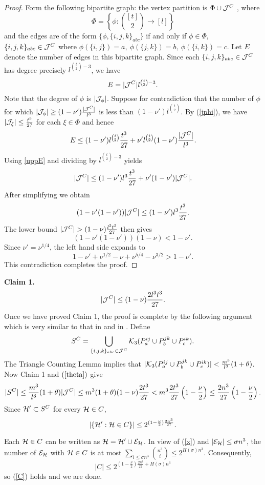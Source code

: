 \documentclass[11pt]{article}
\begin{document}
\begin{proof}  Form the following bipartite graph: the vertex partition is
$\Phi \cup {\cal J}^C$ , where
$$\Phi=\left\{\phi: {[t]\choose 2} \rightarrow [l]\right\}$$
and the edges are of the form $\{\phi, \{i,j,k\}_{abc}\}$ if and only if $\phi \in \Phi$,
 $\{i,j,k\}_{abc}\in {\cal J}^C$ where $\phi(\{i,j\})=a,\  \phi(\{j,k\})=b,\  \phi(\{i,k\})=c$.
 Let $E$ denote the number of edges in this bipartite graph. Since each $\{i,j,k\}_{abc} \in {\cal J}^C$ has degree precisely
$l^{{t \choose 2}-3}$, we have \begin{equation}\label{uppE}
E=|\cJ^C|
l^{{t \choose 2}-3}.\end{equation} Note that the degree of $\phi$ is
$|{\cal J}_{\phi}|$.
 Suppose for contradiction that the number of $\phi$ for which
 $|{\cal J}_{\phi}| \ge (1-\nu')\frac{|{\cal J}^C|}{l^3}$ is less than $(1-\nu') l^{{t \choose 2}}$.
  By (\ref{jphi}), we have $|{\cal J}_{\xi}|\le \frac{t^3}{27}$ for each $\xi\in \Phi$ and hence
\begin{equation}\label{upptwoE}E\le (1-\nu') l^{{t \choose 2}}\frac{t^3}{27} + \nu'l^{{t \choose
2}}(1-\nu')\frac{|\cJ^C|}{l^3}.\end{equation} Using \eqref{uppE}
 and dividing by $l^{{t \choose 2}-3}$  yields
$$|{\cal J}^C| \le (1-\nu')l^3\frac{t^3}{27} + \nu'(1-\nu')|{\cal J}^C|.$$
After simplifying we obtain
$$(1-\nu'(1-\nu'))|{\cal J}^C|\le (1-\nu')l^3\frac{t^3}{27}.$$
  The lower bound $|\cJ^C|>(1-\nu)\frac{l^3t^3}{27}$ then gives
$$(1-\nu'(1-\nu'))(1-\nu)< 1-\nu'.$$
Since $\nu'=\nu^{1/4}$, the left hand side expands to
$$1-\nu'+\nu^{1/2}-\nu+\nu^{5/4}-\nu^{3/2}>1-\nu'.$$
This contradiction completes the proof.\end{proof}

{\bf Claim 1.}
$$|{\cal J}^C|\le (1-\nu)\frac{2l^3 t^3}{27}.$$
Once we have proved Claim 1, the proof is complete by the following
argument which is very similar to that in \cite{NR} and in \cite{t5}. Define
$$S^C=\bigcup_{ \{i,j,k\}_{abc} \in {\cal J}^C} {\cal K}_3(P_a^{ij} \cup P_b^{jk} \cup P_c^{ik}).$$
The Triangle Counting Lemma implies that $|{\cal K}_3(P_a^{ij} \cup
P_b^{jk} \cup P_c^{ik})| <\frac{m^3}{l^3}(1+\theta)$.  Now  Claim 1
and $(\ref{theta})$  give
$$|S^C| \le \frac{m^3}{l^3}(1+\theta)|{\cal J}^C|\le m^3(1+\theta)(1-\nu)\frac{2t^3}{27}<m^3\frac{2t^3}{27}
\left(1-\frac{\nu}{2}\right)\le
\frac{2n^3}{27}\left(1-\frac{\nu}{2}\right).$$
Since $\mathcal{H}' \subset S^C$
for every $\mathcal{H} \in C$,
$$|\{\mathcal{H}': \mathcal{H} \in C\}|\le 2^{(1-\frac{\nu}{2})\frac{2n^3}{27}}.$$

Each $\mathcal{H} \in C$ can be written as $\mathcal{H}=\mathcal{H}' \cup {\cal E}_{\mathcal{H}}$. In view of (\ref{x}) and
$|{\cal E}_{\mathcal{H}}|\le \sigma n^3$, the number of ${\cal E}_{\mathcal{H}}$ with $\mathcal{H} \in
C$ is at most $\sum_{i\le \sigma n^3} {n^3 \choose i}\le
2^{H(\sigma)n^3}$.
 Consequently,
$$|C| \le 2^{(1-\frac{\nu}{2})\frac{2n^3}{27}+H(\sigma)n^3}
$$
so (\ref{C}) holds and we are done.
\end{document}
